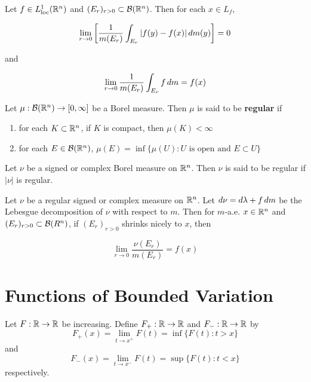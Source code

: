\documentclass{book}
\begin{document}
	\begin{thm}
		Let $f \in L^1_{\text{loc}}(\mathbb{R}^n)$ and $(E_r)_{r>0} \subset \mathcal{B}(\mathbb{R}^n)$. Then for each $x \in L_f$, 
		
		$$\lim_{r \rightarrow 0} \bigg[ \frac{1}{m(E_r)}\int_{E_r}|f(y) - f(x)|\, d m(y)\bigg] =0$$
		
		and 
		
		$$\lim_{r \rightarrow 0}  \frac{1}{m(E_r)}\int_{E_r}f\, d m = f(x)$$
	\end{thm}
	
	\begin{defn}  
		Let $\mu:\mathcal{B}(\mathbb{R}^n) \rightarrow [0,\infty]$ be a Borel measure. Then $\mu$ is said to be \textbf{regular} if 
		\begin{enumerate}
			\item for each $K \subset \mathbb{R}^n$, if $K$ is compact, then $\mu(K)< \infty$
			\item for each $E \in \mathcal{B}(\mathbb{R}^n)$, $\mu(E) = \inf \{\mu(U): U \text{ is open and }E \subset U\}$
		\end{enumerate}
		
		Let $\nu$ be a signed or complex Borel measure on $\mathbb{R}^n$. Then $\nu$ is said to be regular if $|\nu|$ is regular.
	\end{defn}
	
	\begin{thm}
		Let $\nu$ be a regular signed or complex measure on $\mathbb{R}^n$. Let $d\nu = d\lambda + f \, d m$ be the Lebesgue decomposition of $\nu$ with respect to $m$. Then for $m$-a.e. $x \in \mathbb{R}^n$ and $(E_r)_{r >0} \subset \mathcal{B}(R^n)$, if $(E_r)_{r >0}$ shrinks nicely to $x$, then 
		
		$$\lim_{r \rightarrow 0} \frac{\nu(E_r)}{m(E_r)} = f(x)$$
	\end{thm}
	
	
	
	
	
	
	
	
	
	
	
	
	
	
	
	
	\newpage
	\section{Functions of Bounded Variation}
	
	\begin{defn}  
		Let $F:\mathbb{R} \rightarrow \mathbb{R}$ be increasing. Define $F_+:\mathbb{R} \rightarrow \mathbb{R}$ and $F_-:\mathbb{R} \rightarrow \mathbb{R}$ by $$F_+(x) = \lim_{t \rightarrow x^+}F(t) = \inf \{F(t): t>x \}$$ and $$F_-(x) =  \lim_{t \rightarrow x^-}F(t) = \sup \{F(t): t < x \}$$ respectively.
	\end{defn}
	
\end{document}
